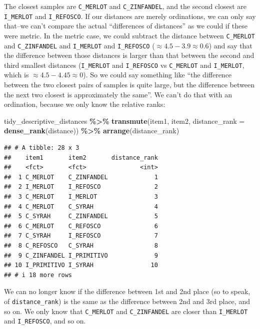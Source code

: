 \documentclass[
]{book}
\newenvironment{Shaded}{\begin{snugshade}}{\end{snugshade}}
\newcommand{\AttributeTok}[1]{\textcolor[rgb]{0.13,0.29,0.53}{#1}}
\newcommand{\FunctionTok}[1]{\textcolor[rgb]{0.13,0.29,0.53}{\textbf{#1}}}
\newcommand{\NormalTok}[1]{#1}
\newcommand{\SpecialCharTok}[1]{\textcolor[rgb]{0.81,0.36,0.00}{\textbf{#1}}}
\begin{document}
The closest samples are \texttt{C\_MERLOT} and \texttt{C\_ZINFANDEL}, and the second closest are \texttt{I\_MERLOT} and \texttt{I\_REFOSCO}. If our distances are merely ordinations, we can only say that--we can't compare the actual ``differences of distances'' as we could if these were metric. In the metric case, we could subtract the distance between \texttt{C\_MERLOT} and \texttt{C\_ZINFANDEL} and \texttt{I\_MERLOT} and \texttt{I\_REFOSCO} (\(\approx4.5-3.9\approx0.6\)) and say that the difference between those distances is larger than that between the second and third smallest distances (\texttt{I\_MERLOT} and \texttt{I\_REFOSCO} vs \texttt{C\_MERLOT} and \texttt{I\_MERLOT}, which is \(\approx4.5-4.45\approx0\)). So we could say something like ``the difference between the two closest pairs of samples is quite large, but the difference between the next two closest is approximately the same''. We can't do that with an ordination, because we only know the relative ranks:

\begin{Shaded}
\begin{Highlighting}[]
\NormalTok{tidy\_descriptive\_distances }\SpecialCharTok{\%\textgreater{}\%}
  \FunctionTok{transmute}\NormalTok{(item1, item2, }
            \AttributeTok{distance\_rank =} \FunctionTok{dense\_rank}\NormalTok{(distance)) }\SpecialCharTok{\%\textgreater{}\%}
  \FunctionTok{arrange}\NormalTok{(distance\_rank)}
\end{Highlighting}
\end{Shaded}

\begin{verbatim}
## # A tibble: 28 x 3
##    item1       item2       distance_rank
##    <fct>       <fct>               <int>
##  1 C_MERLOT    C_ZINFANDEL             1
##  2 I_MERLOT    I_REFOSCO               2
##  3 C_MERLOT    I_MERLOT                3
##  4 C_MERLOT    C_SYRAH                 4
##  5 C_SYRAH     C_ZINFANDEL             5
##  6 C_MERLOT    C_REFOSCO               6
##  7 C_SYRAH     I_REFOSCO               7
##  8 C_REFOSCO   C_SYRAH                 8
##  9 C_ZINFANDEL I_PRIMITIVO             9
## 10 I_PRIMITIVO I_SYRAH                10
## # i 18 more rows
\end{verbatim}

We can no longer know if the difference between 1st and 2nd place (so to speak, of \texttt{distance\_rank}) is the same as the difference between 2nd and 3rd place, and so on. We only know that \texttt{C\_MERLOT} and \texttt{C\_ZINFANDEL} are closer than \texttt{I\_MERLOT} and \texttt{I\_REFOSCO}, and so on.
\end{document}
